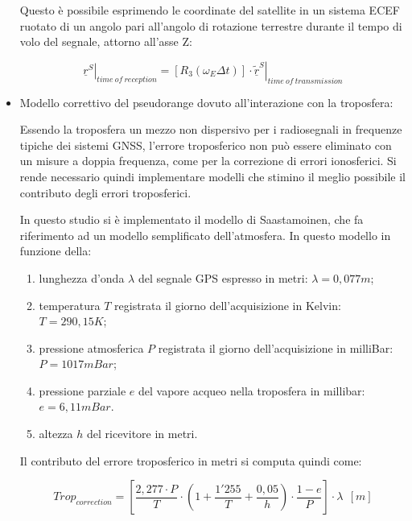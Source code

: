 \documentclass[a4paper,11pt,twoside]{book}
\begin{document}
\begin{itemize}[-]
		Questo è possibile esprimendo le coordinate del satellite in un sistema ECEF ruotato di un angolo pari all'angolo di rotazione terrestre durante il tempo di volo del segnale, attorno all'asse Z:
		
		\begin{equation}
			\left. \underline{r}^S\right|_{time \ of \ reception} = [R_3(\omega_E \Delta t)] \cdot \left. \underline{\tilde{r}}^S\right|_{time \ of \ transmission}
		\end{equation}
		
		\item Modello correttivo del pseudorange dovuto all'interazione con la troposfera:
		
		Essendo la troposfera un mezzo non dispersivo per i radiosegnali in frequenze tipiche dei sistemi GNSS, l'errore troposferico non può essere eliminato con un misure a doppia frequenza, come per la correzione di errori ionosferici. Si rende necessario quindi implementare modelli che stimino il meglio possibile il contributo degli errori troposferici.
		
		In questo studio si è implementato il modello di Saastamoinen, che fa riferimento ad un modello semplificato dell'atmosfera. In questo modello in funzione della:
		
		\begin{enumerate}
			\item lunghezza d'onda $\lambda$ del segnale GPS espresso in metri: $\lambda = 0,077m$;
			
			\item temperatura $T$ registrata il giorno dell'acquisizione in Kelvin: $T = 290,15K$;
			
			\item pressione atmosferica $P$ registrata il giorno dell'acquisizione in milliBar: $P = 1017mBar$;
			
			\item pressione parziale $e$ del vapore acqueo nella troposfera in millibar: $e = 6,11mBar$.
			
			\item altezza $h$ del ricevitore in metri.
		\end{enumerate}
		
		Il contributo del errore troposferico in metri si computa quindi come:
		
		\begin{equation}
			Trop_{correction} = \left[  \frac{2,277 \cdot P}{T} \cdot \left( 1 +  \frac{1'255}{T} + \frac{0,05}{h} \right) \cdot \frac{1 - e}{P}\right] \cdot \lambda \ \ [m]
		\end{equation}
	\end{itemize}
	
\end{document}
